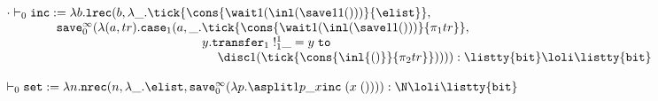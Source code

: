 \begin{small}
  $$
\begin{array}{l}
\cdot \vdash_0 \texttt{inc} := \lambda b. \texttt{lrec}(b,\lambda \_. \tick {\cons {\wait 1 ({\inl ({\save 1 1 {()}})}) } {\elist} },\\
  \hspace{4em} \texttt{save}^{\infty}_0 (\lambda (a,tr). \texttt{case}_1(a,\_.{\tick {\cons {\wait 1 ({\inl ({\save 1 1 {()}})})} {\pi_1 tr} } },\\
      \hspace{15.75em} y. \texttt{transfer}_1 \; !^1_1 \_ = y \; \texttt{to} \\
       \hspace{17em} {\disc 1 {(\tick {\cons {\inl {()}} {\pi_2 tr}})}}))) : \listty {\texttt{bit}} \loli \listty {\texttt{bit}}
\\\\
\vdash_{0} \texttt{set} := \lambda n. \texttt{nrec}(n,\lambda \_. \elist,
  \texttt{save}^\infty_0(\lambda p.
   \asplit 1 {p} {\_} x {\texttt{inc} \; (x \; ())}
  )
) : \N \loli \listty{\texttt{bit}}
\end{array}
$$
\end{small}
